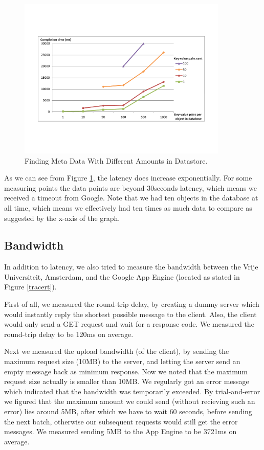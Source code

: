 \begin{figure} %
\begin{center}
\includegraphics[trim=5cm 4cm 5cm 5cm,width=10cm]{./figures/find_amt.pdf}
\caption{Finding Meta Data With Different Amounts in Datastore.
\label{find-md-amt}}
\end{center}
\end{figure}

As we can see from Figure \ref{find-md-amt}, the latency does increase
exponentially. For some measuring points the data points are beyond 30seconds
latency, which means we received a timeout from Google. Note that we had ten
objects in the database at all time, which means we effectively had ten times
as much data to compare as suggested by the x-axis of the graph.

\subsection{Bandwidth}
In addition to latency, we also tried to measure the bandwidth between the
Vrije Universiteit, Amsterdam, and the Google App Engine (located as stated in
Figure \ref{tracert}).

First of all, we measured the round-trip delay, by creating a dummy server
which would instantly reply the shortest possible message to the client. Also,
the client would only send a GET request and wait for a response code. We
measured the round-trip delay to be 120ms on average.

Next we measured the upload bandwidth (of the client), by sending the maximum
request size (10MB) to the server, and letting the server send an empty message
back as minimum response. Now we noted that the maximum request size actually
is smaller than 10MB. We regularly got an error message which indicated that
the bandwidth was temporarily exceeded. By trial-and-error we figured that the
maximum amount we could send (without recieving such an error) lies around
5MB, after which we have to wait 60 seconds, before sending the next batch,
otherwise our subsequent requests would still get the error messages. We
measured sending 5MB to the App Engine to be 3721ms on average.


